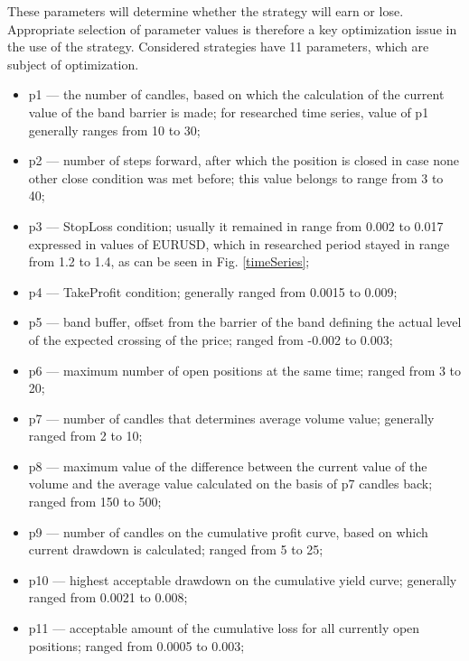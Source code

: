 \documentclass{tewiart}
\begin{document}
These parameters will determine whether the strategy will earn or lose. Appropriate selection of parameter values is therefore a key optimization issue in the use of the strategy. Considered strategies have 11 parameters, which are subject of optimization.
\begin{itemize}
\item p1 --- the number of candles, based on which the calculation of the current value of the band barrier is made; for researched time series, value of p1 generally ranges from 10 to 30;
\item p2 --- number of steps forward, after which the position is closed in case none other close condition was met before; this value belongs to range from 3 to 40;
\item p3 --– StopLoss condition; usually it remained in range from 0.002 to 0.017 expressed in values of EURUSD, which in researched period stayed in range from 1.2 to 1.4, as can be seen in Fig. \ref{timeSeries};
\item p4 --– TakeProfit condition; generally ranged from 0.0015 to 0.009;
\item p5 --- band buffer, offset from the barrier of the band defining the actual level of the expected crossing of the  price; ranged from -0.002 to 0.003;
\item p6 --- maximum number of open positions at the same time; ranged from 3 to 20;
\item p7 --- number of candles that determines average volume value; generally ranged from 2 to 10;
\item p8 --- maximum value of the difference between the current value of the volume and the average value calculated on the basis of p7 candles back; ranged from 150 to 500;
\item p9 --- number of candles on the cumulative profit curve, based on which current drawdown is calculated; ranged from 5 to 25;
\item p10 --- highest acceptable drawdown on the cumulative yield curve; generally ranged from 0.0021 to 0.008;
\item p11 --- acceptable amount of the cumulative loss for all currently open positions; ranged from 0.0005 to 0.003;
\end{itemize}
\end{document}
